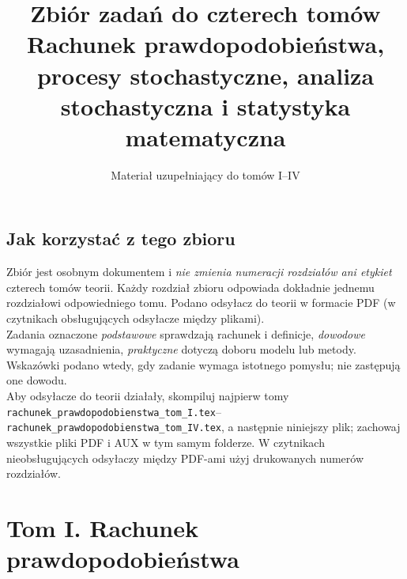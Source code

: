 \documentclass[11pt,a4paper,oneside]{report}
\newcounter{zadanie}[section]
\begin{document}
\title{Zbiór zadań do czterech tomów\\[2mm]\large Rachunek prawdopodobieństwa, procesy stochastyczne, analiza stochastyczna i statystyka matematyczna}
\author{Materiał uzupełniający do tomów I--IV}
\date{}
\maketitle
\tableofcontents
\chapter*{Jak korzystać z tego zbioru}
Zbiór jest osobnym dokumentem i \emph{nie zmienia numeracji rozdziałów ani etykiet} czterech tomów teorii. Każdy rozdział zbioru odpowiada dokładnie jednemu rozdziałowi odpowiedniego tomu. Podano odsyłacz do teorii w formacie PDF (w czytnikach obsługujących odsyłacze między plikami).\\
Zadania oznaczone \textit{podstawowe} sprawdzają rachunek i definicje, \textit{dowodowe} wymagają uzasadnienia, \textit{praktyczne} dotyczą doboru modelu lub metody. Wskazówki podano wtedy, gdy zadanie wymaga istotnego pomysłu; nie zastępują one dowodu.\\
Aby odsyłacze do teorii działały, skompiluj najpierw tomy \texttt{rachunek\_prawdopodobienstwa\_tom\_I.tex}--\texttt{rachunek\_prawdopodobienstwa\_tom\_IV.tex}, a następnie niniejszy plik; zachowaj wszystkie pliki PDF i AUX w tym samym folderze. W czytnikach nieobsługujących odsyłaczy między PDF-ami użyj drukowanych numerów rozdziałów.

\part{Tom I. Rachunek prawdopodobieństwa}
\setcounter{section}{0}
\end{document}
